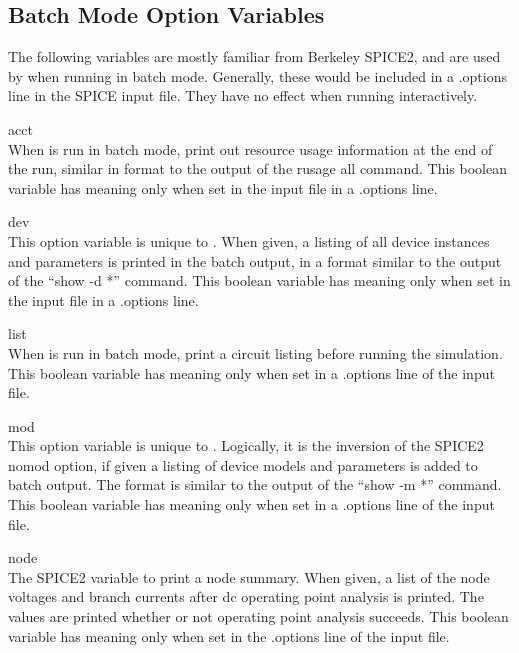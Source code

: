\subsection{Batch Mode Option Variables}
\label{batchvars}

The following variables are mostly familiar from Berkeley SPICE2, and
are used by {\WRspice} when running in batch mode.  Generally, these
would be included in a {\vt .options} line in the SPICE input file. 
They have no effect when running {\WRspice} interactively.

\begin{description}
\item{\et acct}\\
When {\WRspice} is run in batch mode, print out resource usage
information at the end of the run, similar in format to the output of
the {\vt rusage all} command.  This boolean variable has meaning only
when set in the input file in a {\vt .options} line.

\item{\et dev}\\
This option variable is unique to {\WRspice}.  When given, a listing
of all device instances and parameters is printed in the batch output,
in a format similar to the output of the ``{\vt show -d *}'' command. 
This boolean variable has meaning only when set in the input file in a
{\vt .options} line.

\item{\et list}\\
When {\WRspice} is run in batch mode, print a circuit listing before
running the simulation.  This boolean variable has meaning only when
set in a {\vt .options} line of the input file.

\item{\et mod}\\
This option variable is unique to {\WRspice}.  Logically, it is the
inversion of the SPICE2 {\vt nomod} option, if given a listing of
device models and parameters is added to batch output.  The format is
similar to the output of the ``{\vt show -m *}'' command.  This
boolean variable has meaning only when set in a {\vt .options} line
of the input file.

\item{\et node}\\
The SPICE2 variable to print a node summary.  When given, a list of
the node voltages and branch currents after dc operating point
analysis is printed.  The values are printed whether or not operating
point analysis succeeds.  This boolean variable has meaning only when
set in the {\vt .options} line of the input file.


\end{description}
